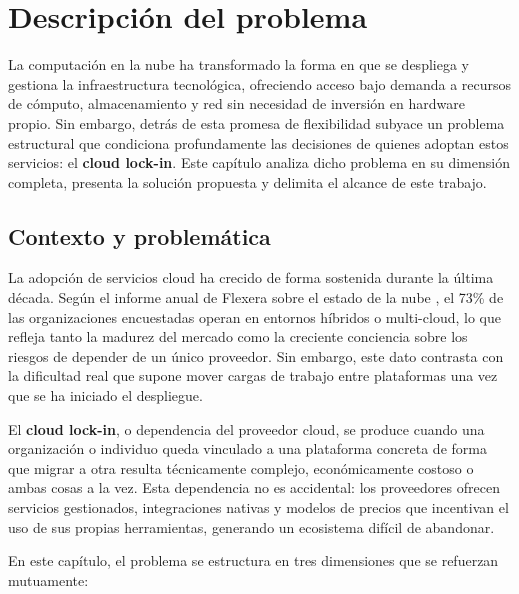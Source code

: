 \chapter{Descripción del problema}\label{cap:descripcion}

La computación en la nube ha transformado la forma en que se despliega y gestiona
la infraestructura tecnológica, ofreciendo acceso bajo demanda a recursos de cómputo,
almacenamiento y red sin necesidad de inversión en hardware propio. Sin embargo,
detrás de esta promesa de flexibilidad subyace un problema estructural que condiciona
profundamente las decisiones de quienes adoptan estos servicios: el \textbf{cloud
lock-in}. Este capítulo analiza dicho problema en su dimensión completa, presenta
la solución propuesta y delimita el alcance de este trabajo.

\section{Contexto y problemática}

La adopción de servicios cloud ha crecido de forma sostenida durante la última
década. Según el informe anual de Flexera sobre el estado de la nube
\cite{flexera2026}, el 73\% de las organizaciones encuestadas operan en entornos
híbridos o multi-cloud, lo que refleja tanto la madurez del mercado como la
creciente conciencia sobre los riesgos de depender de un único proveedor. Sin
embargo, este dato contrasta con la dificultad real que supone mover cargas de
trabajo entre plataformas una vez que se ha iniciado el despliegue.

El \textbf{cloud lock-in}, o dependencia del proveedor cloud, se produce cuando
una organización o individuo queda vinculado a una plataforma concreta de forma
que migrar a otra resulta técnicamente complejo, económicamente costoso o
ambas cosas a la vez. Esta dependencia no es accidental: los proveedores ofrecen
servicios gestionados, integraciones nativas y modelos de precios que incentivan
el uso de sus propias herramientas, generando un ecosistema difícil de abandonar.

En este capítulo, el problema se estructura en tres dimensiones que se refuerzan mutuamente:

